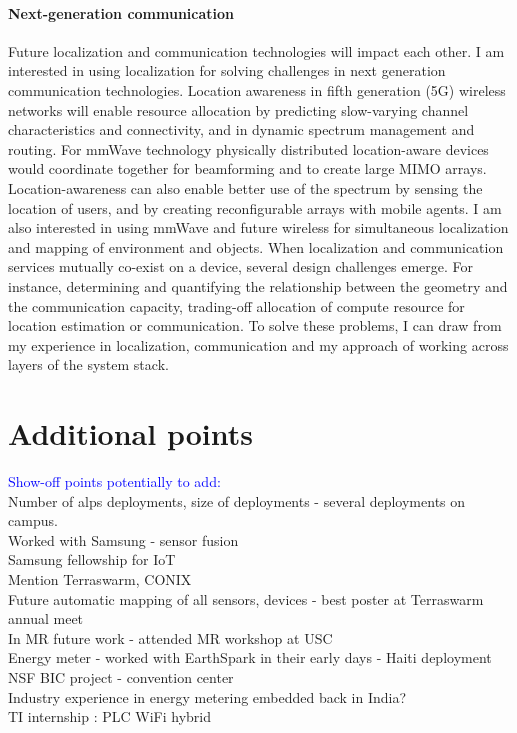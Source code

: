 \documentclass[10pt]{article}
\begin{document}
\paragraph{Next-generation communication}
Future localization and communication technologies will impact each other. 
I am interested in using localization for solving challenges in next generation communication technologies. %
Location awareness in fifth generation (5G) wireless networks will enable resource allocation by predicting slow-varying channel characteristics and connectivity, and in dynamic spectrum management and routing. 
For mmWave technology physically distributed location-aware devices would coordinate together for beamforming and to create large MIMO arrays. 
Location-awareness can also enable better use of the spectrum by sensing the location of users, and by creating reconfigurable arrays with mobile agents. 
I am also interested in using mmWave and future wireless for simultaneous localization and mapping of environment and objects. 
When localization and communication services mutually co-exist on a device, several design challenges emerge. For instance, determining and quantifying the relationship between the geometry and the communication capacity, trading-off allocation of compute resource for location estimation or communication. To solve these problems, I can draw from my experience in localization, communication and my approach of working across layers of the system stack.  

\section{Additional points}
\textcolor{blue}{Show-off points potentially to add:}\\
Number of alps deployments, size of deployments - several deployments on campus.\\
Worked with Samsung - sensor fusion\\
Samsung fellowship for IoT\\
Mention Terraswarm, CONIX\\
Future automatic mapping of all sensors, devices - best poster at Terraswarm annual meet\\
In MR future work - attended MR workshop at USC\\
Energy meter - worked with EarthSpark in their early days - Haiti deployment\\
NSF BIC project - convention center\\
Industry experience in energy metering embedded back in India?\\
TI internship : PLC WiFi hybrid



\small


\end{document}
